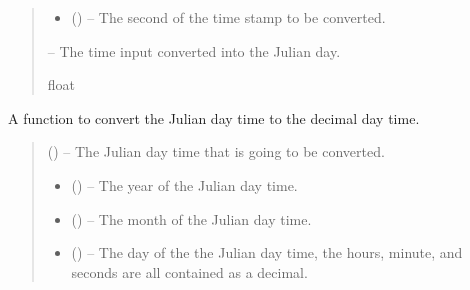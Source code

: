 \documentclass[letterpaper,11pt,english]{sphinxmanual}
\begin{document}
\begin{savenotes}
\begin{fulllineitems}
\begin{quote}
\begin{description}
\begin{itemize}
\item {} 
\sphinxAtStartPar
{} () – The second of the time stamp to be converted.

\end{itemize}

\sphinxAtStartPar
{} – The time input converted into the Julian day.

\sphinxAtStartPar
float

\end{description}\end{quote}

\end{fulllineitems}\end{savenotes}


\begin{savenotes}\begin{fulllineitems}
\label{\detokenize{code/opihiexarata.library.conversion:opihiexarata.library.conversion.julian_day_to_decimal_day}}
\pysigstartsignatures
{}
\pysigstopsignatures
\sphinxAtStartPar
A function to convert the Julian day time to the decimal day time.
\begin{quote}\begin{description}
\sphinxAtStartPar
{} () – The Julian day time that is going to be converted.

\sphinxAtStartPar
\begin{itemize}
\item {} 
\sphinxAtStartPar
{} () – The year of the Julian day time.

\item {} 
\sphinxAtStartPar
{} () – The month of the Julian day time.

\item {} 
\sphinxAtStartPar
{} () – The day of the the Julian day time, the hours, minute, and seconds are all
contained as a decimal.

\end{itemize}


\end{description}\end{quote}

\end{fulllineitems}\end{savenotes}
\end{document}
